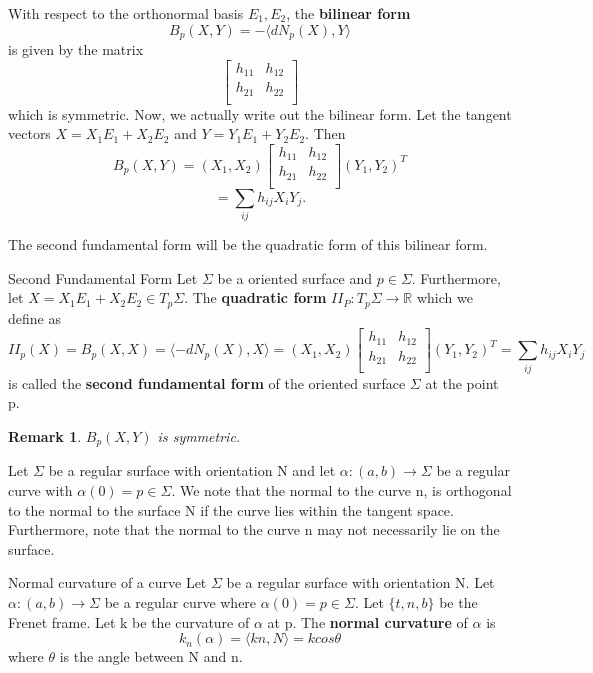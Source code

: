 \documentclass[twoside]{article}
\newtheorem{remark}[theorem]{Remark}
\begin{document}
With respect to the orthonormal basis $E_1, E_2$, the \textbf{bilinear form}
$$
B_p(X,Y) = -\langle dN_p(X), Y \rangle
$$
is given by the matrix 
$$
\begin{bmatrix}
h_{11} & h_{12}\\
h_{21} & h_{22}\\
\end{bmatrix}
$$
which is symmetric. \newline Now, we actually write out the bilinear form. Let
the tangent vectors $X = X_1E_1 + X_2E_2$ and $Y = Y_1E_1 + Y_2E_2$. Then 
$$
B_p(X,Y) = (X_1, X_2)\begin{bmatrix}
h_{11} & h_{12}\\
h_{21} & h_{22}\\
\end{bmatrix}
(Y_1, Y_2)^T
$$
$$
= \sum_{ij}h_{ij}X_iY_j.
$$

The second fundamental form will be the quadratic form of this bilinear form.
\begin{definition_exam}{Second Fundamental Form}{} Let $\Sigma$ be a oriented surface and $p \in \Sigma$. Furthermore, let $X = X_1E_1 + X_2E_2 \in T_p\Sigma$. The \textbf{quadratic form} $II_P: T_p\Sigma \rightarrow \mathbb{R}$ which we define as 
$$
II_p(X) = B_p(X,X) = \langle -dN_p(X), X \rangle = (X_1, X_2)\begin{bmatrix}
h_{11} & h_{12}\\
h_{21} & h_{22}\\
\end{bmatrix}
(Y_1, Y_2)^T = \sum_{ij}h_{ij}X_iY_j
$$
is called the \textbf{second fundamental form} of the oriented surface $\Sigma$ at the point p.
\end{definition_exam}

\begin{remark}$B_p(X,Y)$ is symmetric.
\end{remark}

Let $\Sigma$ be a regular surface with orientation N and let $\alpha: (a,b) \rightarrow \Sigma$ be a regular curve with $\alpha(0) = p \in \Sigma.$ We note that the normal to the curve n, is orthogonal to the normal to the surface N if the curve lies within the tangent space. Furthermore, note that the normal to the curve n may not necessarily lie on the surface. 

\begin{definition_exam}{Normal curvature of a curve}{} Let $\Sigma$ be a regular surface with orientation N. Let $\alpha: (a,b) \rightarrow \Sigma$ be a regular curve where $\alpha(0) = p \in \Sigma$. Let $\{t,n,b\}$ be the Frenet frame. Let k be the curvature of $\alpha$ at p. The \textbf{normal curvature} of $\alpha$ is 
$$
k_n(\alpha) = \langle kn, N \rangle = kcos\theta
$$
where $\theta$ is the angle between N and n.
\end{definition_exam}
\end{document}
